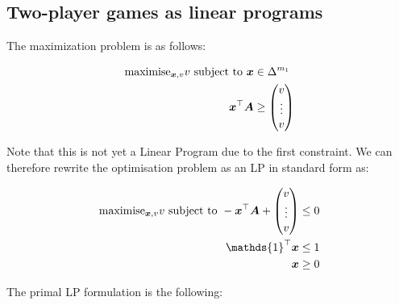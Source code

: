 \subsection{Two-player games as linear programs}

The maximization problem is as follows:

\begin{equation}
	\begin{split}
		\text{maximise}_{\bm{x},v} v \text{ subject to } \bm{x} & \in \Delta^{m_1} \\
		\bm{x}^\top \bm{A} & \ge \begin{pmatrix}
			v \\
			\vdots \\
			v
		\end{pmatrix}
	\end{split}
\end{equation}

Note that this is not yet a Linear Program due to the first constraint. We can
therefore rewrite the optimisation problem as an LP in standard form as:

\begin{equation}
	\begin{split}
		\text{maximise}_{\vect{x},v} v \text{ subject to }
		-\vect{x}^\top \vect{A} + \begin{pmatrix}
			v \\
			\vdots \\
			v
		\end{pmatrix} & \le 0 \\
		\mathds{1}^\top \vect{x} & \le 1 \\
		\vect{x} & \ge 0
	\end{split}
\end{equation}

The primal LP formulation is the following:

